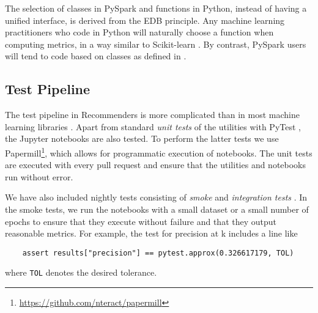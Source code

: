 The selection of classes in PySpark and functions in Python, instead of having a unified
interface, is derived from the EDB principle. Any machine learning practitioners
who code in Python will naturally choose a function when computing metrics, 
in a way similar to Scikit-learn \cite{pedregosa2011scikit}. By contrast, PySpark users 
will tend to code based on classes as defined in \cite{meng2016mllib}. 

\subsection{Test Pipeline}

The test pipeline in Recommenders is more complicated than in most machine learning
libraries \cite{abadi2016tensorflow,paszke2017automatic,pedregosa2011scikit,ke2017lightgbm}.
Apart from standard {\em unit tests} of the utilities with PyTest \cite{krekel2004pytest}, 
the Jupyter notebooks are also tested. To perform the latter tests we use 
Papermill\footnote{\url{https://github.com/nteract/papermill}}, 
which allows for programmatic execution of notebooks. The
unit tests are executed with every pull request and ensure that the utilities and 
notebooks run without error.

We have also included nightly tests consisting of {\em smoke} and {\em integration tests}
\cite{gonzalez-fierro2018beginners}. In the smoke tests, we run the notebooks with a 
small dataset or a small number of epochs to ensure that they execute without failure and that they 
output reasonable metrics. 
For example, the test for precision at k includes a line like
\begin{verbatim}
    assert results["precision"] == pytest.approx(0.326617179, TOL)
\end{verbatim}
where \verb!TOL! denotes the desired tolerance.
%

